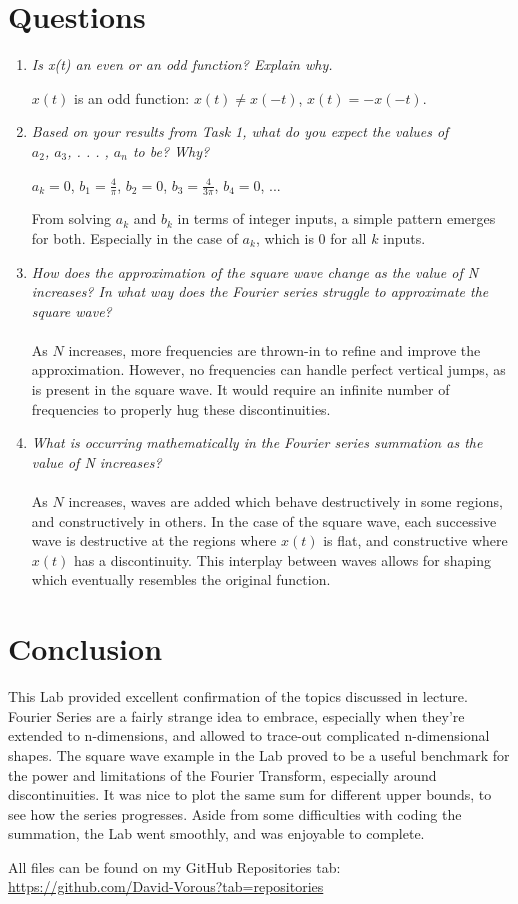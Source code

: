 \documentclass[12pt]{report}
\begin{document}
\section{Questions}
\begin{enumerate}
    \item \textit{Is x(t) an even or an odd function? Explain why.}
    \begin{center}
    $x(t)$ is an odd function: $x(t) \neq x(-t)$, $x(t) = -x(-t)$.
    \end{center}
    \item \textit{Based on your results from Task 1, what do you expect the values of \\$a_2$, $a_3$, . . . , $a_n$ to be?
Why?}
    \begin{center}
    $a_k = 0$, $b_1 = \frac{4}{\pi}$, $b_2 = 0$, $b_3 = \frac{4}{3\pi}$, $b_4 = 0$, ...\\
    \end{center}
    From solving $a_k$ and $b_k$ in terms of integer inputs, a simple pattern emerges for both. Especially in the case of $a_k$, which is 0 for all $k$ inputs.
    \item \textit{How does the approximation of the square wave change as the value of N increases? In what
way does the Fourier series struggle to approximate the square wave?}\\\\
    As $N$ increases, more frequencies are thrown-in to refine and improve the approximation. However, no frequencies can handle perfect vertical jumps, as is present in the square wave. It would require an infinite number of frequencies to properly hug these discontinuities.
    \item \textit{What is occurring mathematically in the Fourier series summation as the value of N increases?}\\\\
    As $N$ increases, waves are added which behave destructively in some regions, and constructively in others. In the case of the square wave, each successive wave is destructive at the regions where $x(t)$ is flat, and constructive where $x(t)$ has a discontinuity. This interplay between waves allows for shaping which eventually resembles the original function.
\end{enumerate}

\pagebreak

\section{Conclusion}
This Lab provided excellent confirmation of the topics discussed in lecture. Fourier Series are a fairly strange idea to embrace, especially when they're extended to n-dimensions, and allowed to trace-out complicated n-dimensional shapes. The square wave example in the Lab proved to be a useful benchmark for the power and limitations of the Fourier Transform, especially around discontinuities. It was nice to plot the same sum for different upper bounds, to see how the series progresses. Aside from some difficulties with coding the summation, the Lab went smoothly, and was enjoyable to complete.

All files can be found on my GitHub Repositories tab:\\
\url{https://github.com/David-Vorous?tab=repositories}
\end{document}
